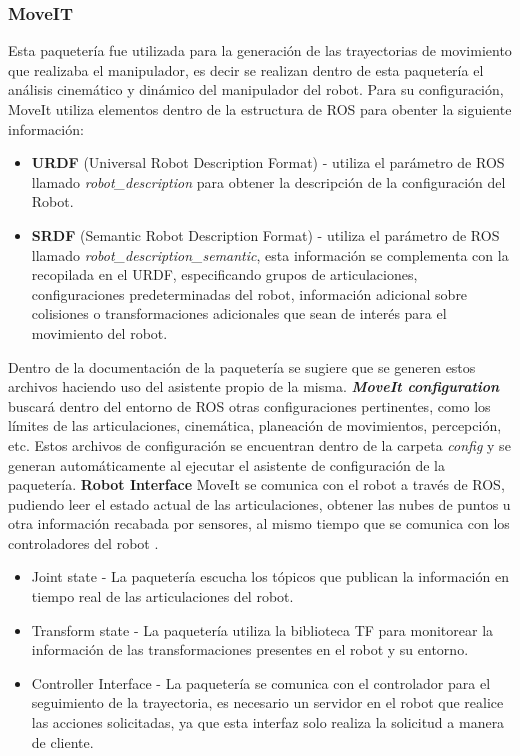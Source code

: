             \subsubsection{MoveIT}
            Esta paquetería fue utilizada para la generación de las trayectorias de movimiento que realizaba el manipulador, es decir se realizan dentro de esta paquetería el análisis cinemático y dinámico del manipulador del robot. Para su configuración, MoveIt utiliza elementos dentro de la estructura de ROS para obenter la siguiente información: 
            \begin{itemize}
                \item \textbf{URDF} (Universal Robot Description Format) - utiliza el parámetro de ROS llamado \textit{robot\_description} para obtener la descripción de la configuración del Robot. 
                \item \textbf{SRDF} (Semantic Robot Description Format) - utiliza el parámetro de ROS llamado \textit{robot\_description\_semantic}, esta información se complementa con la recopilada en el URDF, especificando grupos de articulaciones, configuraciones predeterminadas del robot, información adicional sobre colisiones o transformaciones adicionales que sean de interés para el movimiento del robot. 
                \end{itemize}                
                Dentro de la documentación de la paquetería se sugiere que se generen estos archivos haciendo uso del asistente propio de la misma. \textbf{\textit{MoveIt configuration}} buscará dentro del entorno de ROS otras configuraciones pertinentes, como los límites de las articulaciones, cinemática, planeación de movimientos, percepción, etc. Estos archivos de configuración se encuentran dentro de la carpeta \textit{config} y se generan automáticamente al ejecutar el asistente de configuración de la paquetería.
            \textbf{Robot Interface}
             MoveIt se comunica con el robot a través de ROS, pudiendo leer el estado actual de las articulaciones, obtener las nubes de puntos u otra información recabada por sensores, al mismo tiempo que se comunica con los controladores del robot \cite{ROS_concepts_MoveIt}.
             \begin{itemize}
                 \item Joint state - La paquetería escucha los tópicos que publican la información en tiempo real de las articulaciones del robot.
                 \item Transform state - La paquetería utiliza la biblioteca TF para monitorear la información de las transformaciones presentes en el robot y su entorno.
                 \item Controller Interface - La paquetería se comunica con el controlador para el seguimiento de la trayectoria, es necesario un servidor en el robot que realice las acciones solicitadas, ya que esta interfaz solo realiza la solicitud a manera de cliente.
             \end{itemize}
             
